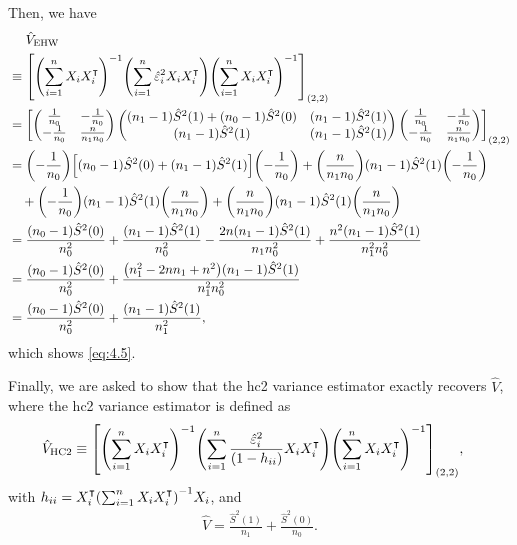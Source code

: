 \documentclass[10pt]{article}
\begin{document}
Then, we have
\begin{align*}
  &\mathrel{\phantom{=}} \hat{V}_{\text{EHW}} \\
  &\equiv {\left[ {\left( \sum_{i=1}^n X_i X_i^\intercal \right)}^{-1} {\left( \sum_{i=1}^n \hat{\varepsilon}_i^2 X_i X_i^\intercal \right)} {\left( \sum_{i=1}^n X_i X_i^\intercal \right)}^{-1} \right]}_{{\left( 2, 2 \right)}}\\
  &= {\left[ 
    \begin{pmatrix}
      \frac{1}{n_0} & -\frac{1}{n_0} \\
      -\frac{1}{n_0} & \frac{n}{n_1 n_0}
    \end{pmatrix}
    \begin{pmatrix}
      (n_1 - 1) \hat{S}^2(1) + (n_0 - 1) \hat{S}^2(0) & (n_1 - 1) \hat{S}^2(1) \\
      (n_1 - 1) \hat{S}^2(1) & (n_1 - 1) \hat{S}^2(1)
    \end{pmatrix}
    \begin{pmatrix}
      \frac{1}{n_0} & -\frac{1}{n_0} \\
      -\frac{1}{n_0} & \frac{n}{n_1 n_0}
    \end{pmatrix}
   \right]}_{{\left( 2, 2 \right)}} \\
  &= {\left( -\frac{1}{n_0} \right)} {\left[ (n_0 - 1) \hat{S}^2(0) + (n_1 - 1) \hat{S}^2(1) \right]} {\left( -\frac{1}{n_0} \right)}
  + {\left( \frac{n}{n_1 n_0} \right)} (n_1 - 1) \hat{S}^2(1) {\left( -\frac{1}{n_0} \right)} \\
  &\quad + {\left( -\frac{1}{n_0} \right)} (n_1 - 1) \hat{S}^2(1) {\left( \frac{n}{n_1 n_0} \right)}
  + {\left( \frac{n}{n_1 n_0} \right)} (n_1 - 1) \hat{S}^2(1) {\left( \frac{n}{n_1 n_0} \right)} \\
  &= \frac{(n_0 - 1)\hat{S}^2(0)}{n_0^2} + \frac{(n_1 - 1)\hat{S}^2(1)}{n_0^2}
    - \frac{2n(n_1 - 1) \hat{S}^2(1)}{n_1 n_0^2} 
    + \frac{n^2 (n_1 - 1) \hat{S}^2(1)}{n_1^2 n_0^2} \\ 
  &= \frac{(n_0 - 1)\hat{S}^2(0)}{n_0^2} + \frac{{\left( n_1^2 - 2nn_1 + n^2 \right)} (n_1 - 1)\hat{S}^2(1)}{n_1^2 n_0^2} \\
  &= \frac{(n_0 - 1)\hat{S}^2(0)}{n_0^2} + \frac{(n_1 - 1) \hat{S}^2(1)}{n_1^2},
\end{align*}
which shows \cref{eq:4.5}.

Finally, we are asked to show that
the \gls{hc}2 variance estimator exactly recovers $\hat{V}$,
where the \gls{hc}2 variance estimator is defined as
\begin{align*}
  \hat{V}_{\text{HC2}} 
  &\equiv {\left[ {\left( \sum_{i=1}^n X_i X_i^\intercal \right)}^{-1} {\left( \sum_{i=1}^n \frac{\hat{\varepsilon}_i^2}{(1 - h_{ii})} X_i X_i^\intercal \right)} {\left( \sum_{i=1}^n X_i X_i^\intercal \right)}^{-1} \right]}_{{\left( 2, 2 \right)}},
\end{align*}
with $h_{ii} = X_i^\intercal {\left( \sum_{i=1}^n X_i X_i^\intercal \right)}^{-1} X_i$,
and 
\begin{align*}
  \hat{V} = \frac{\hat{S}^2(1)}{n_1} + \frac{\hat{S}^2(0)}{n_0}.
\end{align*}
\end{document}
